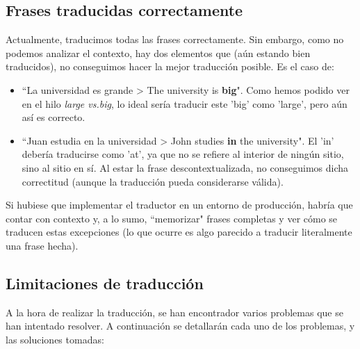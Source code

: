 \documentclass[a4paper]{article}
\begin{document}
    \subsection*{Frases traducidas correctamente}

        Actualmente, traducimos todas las frases correctamente. Sin embargo, como no podemos analizar el contexto, hay dos elementos que (aún estando bien traducidos), no conseguimos hacer la mejor traducción posible. Es el caso de:

        \begin{itemize}

            \item ``La universidad es grande > The university is \textbf{big}". Como hemos podido ver en el hilo \emph{large vs.big}\cite{LVB}, lo ideal sería traducir este 'big' como 'large', pero aún así es correcto.

            \item ``Juan estudia en la universidad > John studies \textbf{in} the university". El 'in' debería traducirse como 'at', ya que no se refiere al interior de ningún sitio, sino al sitio en sí. Al estar la frase descontextualizada, no conseguimos dicha correctitud (aunque la traducción pueda considerarse válida).

        \end{itemize}

        Si hubiese que implementar el traductor en un entorno de producción, habría que contar con contexto y, a lo sumo, ``memorizar" frases completas y ver cómo se traducen estas excepciones (lo que ocurre es algo parecido a traducir literalmente una frase hecha).

    \subsection*{Limitaciones de traducción}

        A la hora de realizar la traducción, se han encontrador varios problemas que se han intentado resolver. A continuación se detallarán cada uno de los problemas, y las soluciones tomadas:
\end{document}

